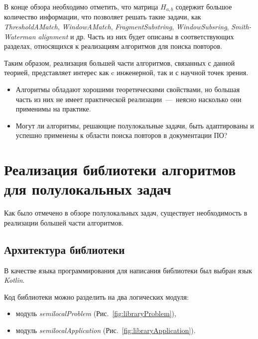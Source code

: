 В конце обзора необходимо отметить, что матрица $H_{a,b}$ содержит большое количество информации, что позволяет решать такие задачи, как \emph{ThresholdAMatch}, \emph{WindowAMatch}, \emph{FragmentSubstring}, \emph{WindowSubsring}, \emph{Smith-Waterman alignment} и др. 
Часть из них будет описаны в соответствующих разделах, относящихся к реализациям алгоритмов для поиска повторов.

Таким образом, реализация большей части алгоритмов, связанных с данной теорией, представляет интерес как c инженерной, так и с научной точек зрения.
\begin{itemize}
\item Алгоритмы обладают хорошими теоретическими свойствами, но большая часть из них не имеет практической реализации~---~неясно насколько они применимы на практике.
\item Могут ли алгоритмы, решающие полулокальные задачи, быть адаптированы и успешно применены к области поиска повторов в документации ПО?
\end{itemize}



\section{Реализация библиотеки алгоритмов для полулокальных задач}\label{librarySection}
Как было отмечено в обзоре полулокальных задач,
существует необходимость в реализации большей части алгоритмов.


\subsection{Архитектура библиотеки}
В качестве языка программирования для написания библиотеки был выбран язык \emph{Kotlin}.

Код библиотеки можно  разделить на два логических модуля:
\begin{itemize}
    \item модуль \emph{semilocalProblem}  (Рис.~\ref{fig:libraryProblem}),
    \item модуль \emph{semilocalApplication} (Рис.~\ref{fig:libraryApplication}).
\end{itemize}


